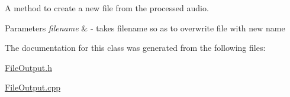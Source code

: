 A method to create a new file from the processed audio. 
\begin{DoxyParams}{Parameters}
{\em filename} & -\/ takes filename so as to overwrite file with new name \\
\hline
\end{DoxyParams}


The documentation for this class was generated from the following files\+:\begin{DoxyCompactItemize}
\item 
\hyperlink{FileOutput_8h}{File\+Output.\+h}\item 
\hyperlink{FileOutput_8cpp}{File\+Output.\+cpp}\end{DoxyCompactItemize}
